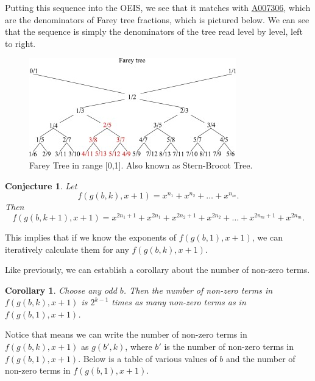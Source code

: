 \documentclass{article}
\newtheorem{corollary}{Corollary}
\newtheorem{conjecture}{Conjecture}
\begin{document}
	Putting this sequence into the OEIS, we see that it matches with \href{https://oeis.org/A007306}{A007306}, which are the denominators of Farey tree fractions, which is pictured below.
	We can see that the sequence is simply the denominators of the tree read level by level, left to right.
	
	\begin{figure}[H]
		\centering
		\includegraphics[width=0.8\textwidth]{farey_tree.jpg}
		\caption{Farey Tree in range [0,1]. Also known as Stern-Brocot Tree.}
	\end{figure}

	\begin{conjecture}
		Let
		\begin{equation*}
			f(g(b,k),x+1) = x^{n_1} + x^{n_2} + \dots + x^{n_m}.
		\end{equation*}
		Then
		\begin{equation*}
			f(g(b,k+1),x+1) = x^{2n_1 + 1} + x^{2n_1} + x^{2n_2 + 1} + x^{2n_2} + \dots + x^{2n_m + 1} + x^{2n_m}.
		\end{equation*}
	\end{conjecture}
	This implies that if we know the exponents of $f(g(b,1),x+1)$, we can iteratively calculate them for any $f(g(b,k),x+1)$.
	
	Like previously, we can establish a corollary about the number of non-zero terms.
	\begin{corollary}
		Choose any odd $b$.
		Then the number of non-zero terms in $f(g(b,k),x+1)$ is $2^{k-1}$ times as many non-zero terms as in $f(g(b,1),x+1)$.
	\end{corollary}
	Notice that means we can write the number of non-zero terms in $f(g(b,k),x+1)$ as $g(b',k)$, where $b'$ is the number of non-zero terms in $f(g(b,1),x+1)$.
	Below is a table of various values of $b$ and the number of non-zero terms in $f(g(b,1),x+1)$.
	
\end{document}
